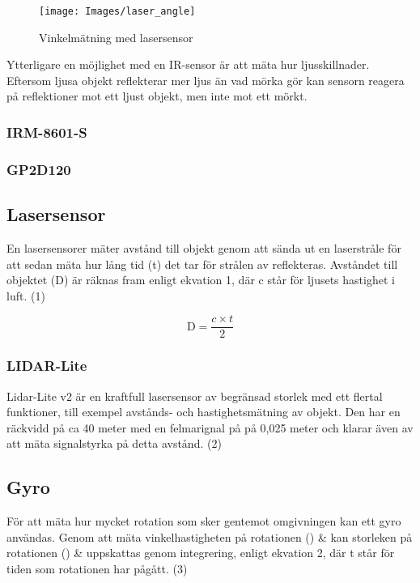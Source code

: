 \documentclass[11pt]{article}
\begin{document}
\begin{flushleft}
\begin{figure}[htbp]
	\centering
	\texttt{[image: Images/laser\_angle]}
	\caption{Vinkelmätning med lasersensor \label{laser_angle}}
\end{figure}

Ytterligare en möjlighet med en IR-sensor är att mäta hur ljusskillnader. Eftersom ljusa objekt reflekterar mer ljus än vad mörka gör kan sensorn reagera på reflektioner mot ett ljust objekt, men inte mot ett mörkt.


\subsubsection{IRM-8601-S}


\subsubsection{GP2D120}

\subsection{Lasersensor}
En lasersensorer mäter avstånd till objekt genom att sända ut en laserstråle för att sedan mäta hur lång tid (t) det tar för strålen av reflekteras. Avståndet till objektet (D) är räknas fram enligt ekvation 1, där c står för ljusets hastighet i luft. (1)

\begin{equation*}
	\textrm{D} = \frac {c \times t}{2}						
\end{equation*}



\subsubsection{LIDAR-Lite}
Lidar-Lite v2 är en kraftfull lasersensor av begränsad storlek med ett flertal funktioner, till exempel avstånds- och hastighetsmätning av objekt. Den har en räckvidd på ca 40 meter med en felmarignal på på 0,025 meter och klarar även av att mäta signalstyrka på detta avstånd. (2)




\subsection{Gyro}
För att mäta hur mycket rotation som sker gentemot omgivningen kan ett gyro användas. Genom att mäta vinkelhastigheten på rotationen (\textomega) & kan storleken på rotationen (\straightphi) & uppskattas genom integrering, enligt ekvation 2, där t står för tiden som rotationen har pågått. (3)


\end{flushleft}
\end{document}
